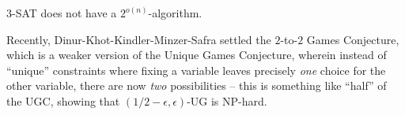 	\begin{fcon}
		$3$-SAT does not have a $2^{o(n)}$-algorithm.
	\end{fcon}

	Recently, Dinur-Khot-Kindler-Minzer-Safra \cite{2-2-gc} settled the $2$-to-$2$ Games Conjecture, which is a weaker version of the Unique Games Conjecture, wherein instead of ``unique'' constraints where fixing a variable leaves precisely \emph{one} choice for the other variable, there are now \emph{two} possibilities -- this is something like ``half'' of the UGC, showing that $(1/2-\epsilon,\epsilon)$-UG is \textsf{NP}-hard.\\
